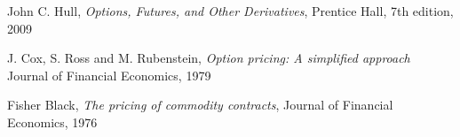 \begin{thebibliography}{9}
John C. Hull,
\textit{Options, Futures, and Other Derivatives},
Prentice Hall, 7th edition, 2009

J. Cox, S. Ross and M. Rubenstein,
\textit{Option pricing: A simplified approach}
Journal of Financial Economics, 1979

Fisher Black,
\textit{The pricing of commodity contracts},
Journal of Financial Economics, 1976

\end{thebibliography}